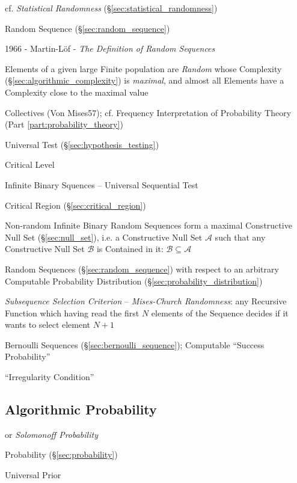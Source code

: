 cf. \emph{Statistical Randomness} (\S\ref{sec:statistical_randomness})

Random Sequence (\S\ref{sec:random_sequence})

1966 - Martin-L\"of - \emph{The Definition of Random Sequences}

Elements of a given large Finite population are \emph{Random} whose Complexity
(\S\ref{sec:algorithmic_complexity}) is \emph{maximal}, and almost all Elements
have a Complexity close to the maximal value

Collectives (Von Mises57); cf. Frequency Interpretation of Probability Theory
(Part \ref{part:probability_theory})

Universal Test (\S\ref{sec:hypothesis_testing})

Critical Level

Infinite Binary Squences -- Universal Sequential Test

Critical Region (\S\ref{sec:critical_region})

Non-random Infinite Binary Random Sequences form a maximal Constructive Null Set
(\S\ref{sec:null_set}), i.e. a Constructive Null Set $\mathcal{A}$ such that any
Constructive Null Set $\mathcal{B}$ is Contained in it:
$\mathcal{B} \subseteq \mathcal{A}$

Random Sequences (\S\ref{sec:random_sequence}) with respect to an arbitrary
Computable Probability Distribution (\S\ref{sec:probability_distribution})

\emph{Subsequence Selection Criterion} --
\emph{Mises-Church Randomness}: any Recursive Function which having read the
first $N$ elements of the Sequence decides if it wants to select element $N+1$

Bernoulli Sequences (\S\ref{sec:bernoulli_sequence}); Computable ``Success
Probability''

``Irregularity Condition''



\subsection{Algorithmic Probability}\label{sec:algorithmic_probability}

or \emph{Solomonoff Probability}

\fist Probability (\S\ref{sec:probability})

Universal Prior

